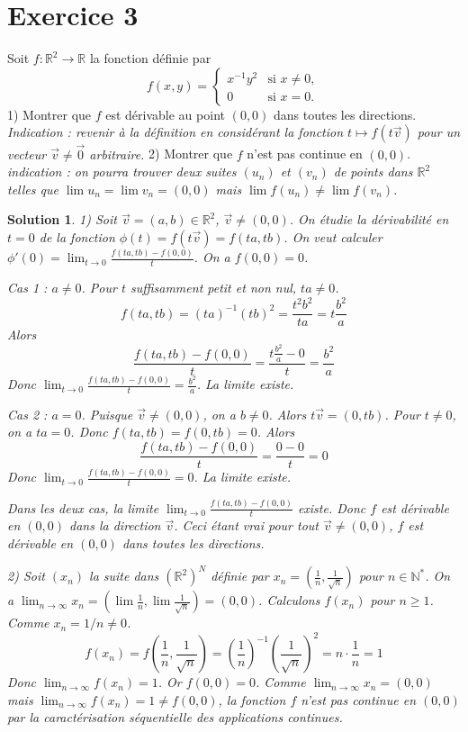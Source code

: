 \documentclass{article}
\newtheorem{solution}{Solution}
\begin{document}
\section{Exercice 3}
Soit $f : \mathbb{R}^2 \to \mathbb{R}$ la fonction définie par
\[ f(x,y) = \begin{cases} x^{-1}y^2 & \text{si } x \neq 0, \\ 0 & \text{si } x = 0. \end{cases} \]
1) Montrer que $f$ est dérivable au point $(0,0)$ dans toutes les directions.
\textit{Indication : revenir à la définition en considérant la fonction $t \mapsto f(t\vec{v})$ pour un vecteur $\vec{v} \neq \vec{0}$ arbitraire.}
2) Montrer que $f$ n'est pas continue en $(0,0)$.
\textit{indication : on pourra trouver deux suites $(u_n)$ et $(v_n)$ de points dans $\mathbb{R}^2$ telles que $\lim u_n = \lim v_n = (0,0)$ mais $\lim f(u_n) \neq \lim f(v_n)$.}

\begin{solution}
1) Soit $\vec{v} = (a,b) \in \mathbb{R}^2$, $\vec{v} \neq (0,0)$. On étudie la dérivabilité en $t=0$ de la fonction $\phi(t) = f(t\vec{v}) = f(ta, tb)$.
On veut calculer $\phi'(0) = \lim_{t \to 0} \frac{f(ta, tb) - f(0,0)}{t}$. On a $f(0,0) = 0$.

Cas 1 : $a \neq 0$.
Pour $t$ suffisamment petit et non nul, $ta \neq 0$.
\[ f(ta, tb) = (ta)^{-1} (tb)^2 = \frac{t^2 b^2}{ta} = t \frac{b^2}{a} \]
Alors
\[ \frac{f(ta, tb) - f(0,0)}{t} = \frac{t \frac{b^2}{a} - 0}{t} = \frac{b^2}{a} \]
Donc $\lim_{t \to 0} \frac{f(ta, tb) - f(0,0)}{t} = \frac{b^2}{a}$. La limite existe.

Cas 2 : $a = 0$.
Puisque $\vec{v} \neq (0,0)$, on a $b \neq 0$.
Alors $t\vec{v} = (0, tb)$. Pour $t \neq 0$, on a $ta = 0$.
Donc $f(ta, tb) = f(0, tb) = 0$.
Alors
\[ \frac{f(ta, tb) - f(0,0)}{t} = \frac{0 - 0}{t} = 0 \]
Donc $\lim_{t \to 0} \frac{f(ta, tb) - f(0,0)}{t} = 0$. La limite existe.

Dans les deux cas, la limite $\lim_{t \to 0} \frac{f(ta, tb) - f(0,0)}{t}$ existe.
Donc $f$ est dérivable en $(0,0)$ dans la direction $\vec{v}$. Ceci étant vrai pour tout $\vec{v} \neq (0,0)$, $f$ est dérivable en $(0,0)$ dans toutes les directions.

2) Soit $(x_n)$ la suite dans $(\mathbb{R}^2)^N$ définie par $x_n = (\frac{1}{n}, \frac{1}{\sqrt{n}})$ pour $n \in \mathbb{N}^*$.
On a $\lim_{n \to \infty} x_n = (\lim \frac{1}{n}, \lim \frac{1}{\sqrt{n}}) = (0, 0)$.
Calculons $f(x_n)$ pour $n \ge 1$. Comme $x_n = 1/n \neq 0$.
\[ f(x_n) = f(\frac{1}{n}, \frac{1}{\sqrt{n}}) = \left(\frac{1}{n}\right)^{-1} \left(\frac{1}{\sqrt{n}}\right)^2 = n \cdot \frac{1}{n} = 1 \]
Donc $\lim_{n \to \infty} f(x_n) = 1$.
Or $f(0,0) = 0$.
Comme $\lim_{n \to \infty} x_n = (0,0)$ mais $\lim_{n \to \infty} f(x_n) = 1 \neq f(0,0)$, la fonction $f$ n'est pas continue en $(0,0)$ par la caractérisation séquentielle des applications continues.

\end{solution}
\end{document}
